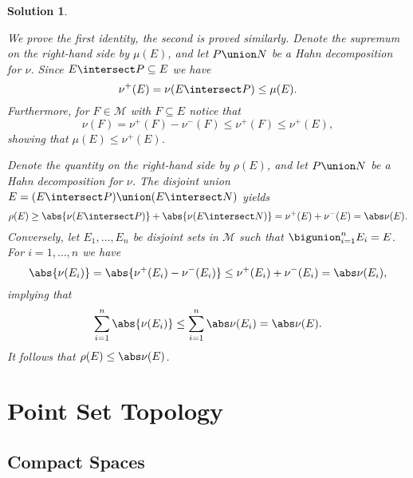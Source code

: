 \documentclass[article, a4paper, 11pt, oneside]{memoir}
\numberwithin{equation}{chapter}
\newcommand{\calM}{\mathcal{M}}
\theoremstyle{nonumberplain}
\newtheorem{solution}{Solution}
\begin{document}
\begin{solution}
\begin{solutionsec}
	\item We prove the first identity, the second is proved similarly. Denote the supremum on the right-hand side by $\mu(E)$, and let $P \union N$ be a Hahn decomposition for $\nu$. Since $E \intersect P \subseteq E$ we have
	\begin{equation*}
		\nu^+(E)
			= \nu(E \intersect P)
			\leq \mu(E).
	\end{equation*}
	Furthermore, for $F \in \calM$ with $F \subseteq E$ notice that
	\begin{equation*}
		\nu(F)
			= \nu^+(F) - \nu^-(F)
			\leq \nu^+(F)
			\leq \nu^+(E),
	\end{equation*}
	showing that $\mu(E) \leq \nu^+(E)$.

	\item Denote the quantity on the right-hand side by $\rho(E)$, and let $P \union N$ be a Hahn decomposition for $\nu$. The disjoint union $E = (E \intersect P) \union (E \intersect N)$ yields
	\begin{equation*}
		\rho(E)
			\geq \abs{\nu(E \intersect P)} + \abs{\nu(E \intersect N)}
			= \nu^+(E) + \nu^-(E)
			= \abs\nu(E). 
	\end{equation*}
	Conversely, let $E_1, \ldots, E_n$ be disjoint sets in $\calM$ such that $\bigunion_{i=1}^n E_i = E$. For $i = 1, \ldots, n$ we have
	\begin{equation*}
		\abs{\nu(E_i)}
			= \abs{ \nu^+(E_i) - \nu^-(E_i) }
			\leq \nu^+(E_i) + \nu^-(E_i)
			= \abs\nu(E_i),
	\end{equation*}
	implying that
	\begin{equation*}
		\sum_{i=1}^n \abs{\nu(E_i)}
			\leq \sum_{i=1}^n \abs\nu(E_i)
			= \abs\nu(E).
	\end{equation*}
	It follows that $\rho(E) \leq \abs\nu(E)$.
\end{solutionsec}
\end{solution}


\chapter{Point Set Topology}

\setcounter{section}{3}
\section{Compact Spaces}
\end{document}
